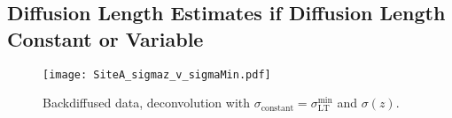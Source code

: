 \documentclass[../../CompleteThesis2/Complete_2ndDraft]{subfiles}
\begin{document}
\subsection[$\sigma$ Constant or Variable]{Diffusion Length Estimates if Diffusion Length Constant or Variable}
\label{Subsec:Results_DiffLenEst_AlphabetCores_SigConstVar}
\begin{figure}[h]
	\centering
	\texttt{[image: SiteA\_sigmaz\_v\_sigmaMin.pdf]}
	\caption[Deconvolution with $\sigma_{\text{constant}}$ and $\sigma(z)$]{\small Backdiffused data, deconvolution with $\sigma_{\text{constant}} = \sigma_{\text{LT}}^{\text{min}}$ and $\sigma(z)$.}
	\label{fig:SiteA_sigmaz_v_sigmaMin}
\end{figure}

%		
%		
%		
%		
%		
\end{document}
